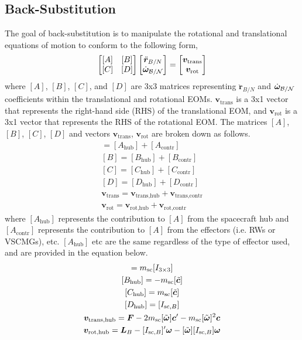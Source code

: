 \subsection{Back-Substitution}
The goal of back-substitution is to manipulate the rotational and translational equations of motion to conform to the following form,
\begin{equation}
\begin{bmatrix}
[A] & [B]\\
[C] & [D]
\end{bmatrix} \begin{bmatrix}
\ddot{\bm r}_{B/N}\\
\dot{\bm\omega}_{\cal B/N}
\end{bmatrix} = \begin{bmatrix}
\bm v_{\text{trans}}\\
\bm v_{\text{rot}}
\end{bmatrix}
\label{eq:backsub}
\end{equation}
where $[A]$, $[B]$, $[C]$, and $[D]$ are 3x3 matrices representing $\ddot{\bm r}_{B/N}$ and $\dot{\bm\omega}_{\cal B/N}$ coefficients within the translational and rotational EOMs. $\bm v_{\text{trans}}$ is a 3x1 vector that represents the right-hand side (RHS) of the translational EOM, and $\bm v_{\text{rot}}$ is a 3x1 vector that represents the RHS of the rotational EOM. The matrices $[A]$, $[B]$, $[C]$, $[D]$ and vectors $\bm v_{\text{trans}}$, $\bm v_{\text{rot}}$ are broken down as follows.
\begin{gather}
[A] = [A_\text{hub}] + [A_\text{contr}]
\\
[B] = [B_\text{hub}] + [B_\text{contr}]
\\
[C] = [C_\text{hub}] + [C_\text{contr}]
\\
[D] = [D_\text{hub}] + [D_\text{contr}]
\\
\bm v_{\text{trans}} = \bm v_{\text{trans,hub}} + \bm v_{\text{trans,contr}}
\\
\bm v_{\text{rot}} = \bm v_{\text{rot,hub}} + \bm v_{\text{rot,contr}}
\end{gather}
where $[A_\text{hub}]$ represents the contribution to $[A]$ from the spacecraft hub and $[A_\text{contr}]$ represents the contribution to $[A]$ from the effectors (i.e. RWs or VSCMGs), etc. $[A_\text{hub}]$ etc are the same regardless of the type of effector used, and are provided in the equation below.
\begin{gather}
[A_\text{hub}] = m_{\text{sc}}[I_{3\times3}]
\\
[B_\text{hub}] = -m_{\text{sc}}[\tilde{\bm{c}}]
\\
[C_\text{hub}] = m_{\text{\text{sc}}}[\tilde{\bm{c}}]
\\
[D_\text{hub}] = [I_{\text{sc},B}]
\\
\bm v_{\text{trans,hub}} = \bm{F} - 2m_{\text{sc}}[\tilde{\bm{\omega}}]\bm{c}' - m_{\text{sc}}[\tilde{\bm{\omega}}]^2\bm{c}
\\
\bm v_{\text{rot,hub}} = \bm{L}_B - [I_{\text{sc},B}]'\bm{\omega} - [\tilde{\bm\omega}][I_{\text{sc},B}]\bm\omega
\end{gather}


